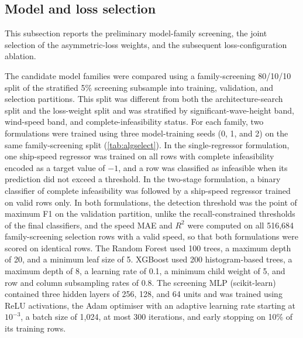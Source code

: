 \documentclass[final,5p,times,twocolumn,numbers]{elsarticle}
\begin{document}
\subsection{Model and loss selection}\label{sec:selection}

This subsection reports the preliminary model-family screening, the joint selection of the asymmetric-loss weights, and the subsequent loss-configuration ablation.

The candidate model families were compared using a family-screening 80/10/10 split of the stratified 5\% screening subsample into training, validation, and selection partitions. This split was different from both the architecture-search split and the loss-weight split and was stratified by significant-wave-height band, wind-speed band, and complete-infeasibility status. For each family, two formulations were trained using three model-training seeds (0, 1, and 2) on the same family-screening split (\autoref{tab:algselect}). In the single-regressor formulation, one ship-speed regressor was trained on all rows with complete infeasibility encoded as a target value of $-1$, and a row was classified as infeasible when its prediction did not exceed a threshold. In the two-stage formulation, a binary classifier of complete infeasibility was followed by a ship-speed regressor trained on valid rows only. In both formulations, the detection threshold was the point of maximum F1 on the validation partition, unlike the recall-constrained thresholds of the final classifiers, and the speed MAE and $R^2$ were computed on all 516{,}684 family-screening selection rows with a valid speed, so that both formulations were scored on identical rows. The Random Forest used 100 trees, a maximum depth of 20, and a minimum leaf size of 5. XGBoost used 200 histogram-based trees, a maximum depth of 8, a learning rate of 0.1, a minimum child weight of 5, and row and column subsampling rates of 0.8. The screening MLP (scikit-learn) contained three hidden layers of 256, 128, and 64 units and was trained using ReLU activations, the Adam optimiser with an adaptive learning rate starting at $10^{-3}$, a batch size of 1{,}024, at most 300 iterations, and early stopping on 10\% of its training rows.
\end{document}
